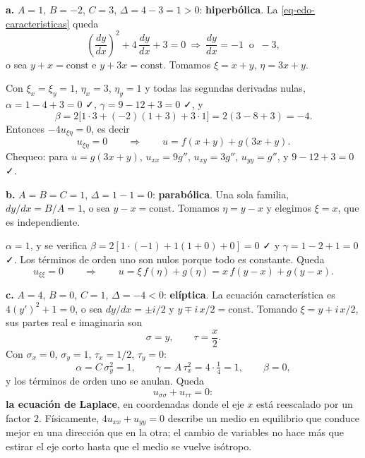 \documentclass[
  spanish,
  a4paper,
]{scrbook}
\theoremstyle{definition}
\theoremstyle{plain}
\theoremstyle{definition}
\theoremstyle{plain}
\theoremstyle{definition}
\theoremstyle{remark}
\begin{document}
\begin{tcolorbox}[enhanced jigsaw, arc=.35mm, bottomrule=.15mm, bottomtitle=1mm, breakable, colback=white, colbacktitle=quarto-callout-tip-color!10!white, colframe=quarto-callout-tip-color-frame, coltitle=black, left=2mm, leftrule=.75mm, opacityback=0, opacitybacktitle=0.6, rightrule=.15mm, title=\textcolor{quarto-callout-tip-color}{\faLightbulb}\hspace{0.5em}{Solución}, titlerule=0mm, toprule=.15mm, toptitle=1mm]

\textbf{a.} \(A=1\), \(B=-2\), \(C=3\), \(\Delta = 4-3 = 1 > 0\):
\textbf{hiperbólica}. La \ref{eq-edo-caracteristicas} queda
\[\left(\frac{dy}{dx}\right)^2 + 4\,\frac{dy}{dx} + 3 = 0 \ \Longrightarrow\
\frac{dy}{dx} = -1 \ \text{ o } \ -3 ,\] o sea \(y+x=\text{const}\) e
\(y+3x=\text{const}\). Tomamos \(\xi = x+y\), \(\eta = 3x+y\).

Con \(\xi_x=\xi_y=1\), \(\eta_x=3\), \(\eta_y=1\) y todas las segundas
derivadas nulas, \(\alpha = 1-4+3 = 0\) ✓, \(\gamma = 9-12+3 = 0\) ✓, y
\[\beta = 2\big[1\cdot 3 + (-2)(1+3) + 3\cdot 1\big] = 2(3-8+3) = -4 .\]
Entonces \(-4u_{\xi\eta} = 0\), es decir
\[u_{\xi\eta} = 0 \qquad\Longrightarrow\qquad u = f(x+y) + g(3x+y).\]
Chequeo: para \(u = g(3x+y)\), \(u_{xx}=9g''\), \(u_{xy}=3g''\),
\(u_{yy}=g''\), y \(9-12+3=0\) ✓.

\textbf{b.} \(A=B=C=1\), \(\Delta = 1-1 = 0\): \textbf{parabólica}. Una
sola familia, \(dy/dx = B/A = 1\), o sea \(y-x=\text{const}\). Tomamos
\(\eta = y-x\) y elegimos \(\xi = x\), que es independiente.

\(\alpha = 1\), y se verifica \(\beta = 2[1\cdot(-1) + 1(1+0) + 0] = 0\)
✓ y \(\gamma = 1 - 2 + 1 = 0\) ✓. Los términos de orden uno son nulos
porque todo es constante. Queda
\[u_{\xi\xi} = 0 \qquad\Longrightarrow\qquad u = \xi\,f(\eta) + g(\eta)
= x\,f(y-x) + g(y-x).\]

\textbf{c.} \(A=4\), \(B=0\), \(C=1\), \(\Delta = -4 < 0\):
\textbf{elíptica}. La ecuación característica es \(4(y')^2 + 1 = 0\), o
sea \(dy/dx = \pm i/2\) y \(y \mp i\,x/2 = \text{const}\). Tomando
\(\xi = y + i\,x/2\), sus partes real e imaginaria son
\[\sigma = y, \qquad \tau = \frac{x}{2}.\] Con \(\sigma_x=0\),
\(\sigma_y=1\), \(\tau_x=1/2\), \(\tau_y=0\):
\[\alpha = C\,\sigma_y^2 = 1, \qquad \gamma = A\,\tau_x^2 = 4\cdot\tfrac14 = 1, \qquad
\beta = 0 ,\] y los términos de orden uno se anulan. Queda
\[u_{\sigma\sigma} + u_{\tau\tau} = 0 :\] \textbf{la ecuación de
Laplace}, en coordenadas donde el eje \(x\) está reescalado por un
factor \(2\). Físicamente, \(4u_{xx}+u_{yy}=0\) describe un medio en
equilibrio que conduce mejor en una dirección que en la otra; el cambio
de variables no hace más que estirar el eje corto hasta que el medio se
vuelve isótropo.

\end{tcolorbox}
\end{document}
